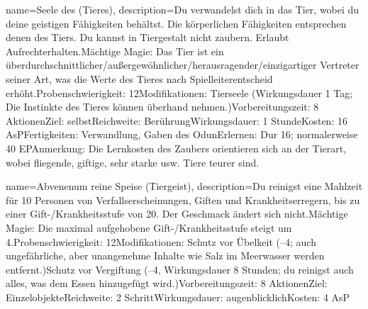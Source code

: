 {
    name={Seele des (Tieres)},
    description={Du verwandelst dich in das Tier, wobei du deine geistigen Fähigkeiten behältst. Die körperlichen Fähigkeiten entsprechen denen des Tiers. Du kannst in Tiergestalt nicht zaubern. Erlaubt Aufrechterhalten.\newline Mächtige Magie: Das Tier ist ein überdurchschnittlicher/außergewöhnlicher/herausragender/einzigartiger Vertreter seiner Art, was die Werte des Tieres nach Spielleiterentscheid erhöht.\newline Probenschwierigkeit: 12\newline Modifikationen: Tierseele (Wirkungsdauer 1 Tag; Die Instinkte des Tieres können überhand nehmen.)\newline Vorbereitungszeit: 8 Aktionen\newline Ziel: selbst\newline Reichweite: Berührung\newline Wirkungsdauer: 1 Stunde\newline Kosten: 16 AsP\newline Fertigkeiten: Verwandlung, Gaben des Odun\newline Erlernen: Dur 16; normalerweise 40 EP\newline Anmerkung: Die Lernkosten des Zaubers orientieren sich an der Tierart, wobei fliegende, giftige, sehr starke usw. Tiere teurer sind.}
}


{
    name={Abvenenum reine Speise (Tiergeist)},
    description={Du reinigst eine Mahlzeit für 10 Personen von Verfallserscheinungen, Giften und Krankheitserregern, bis zu einer Gift-/Krankheitsstufe von 20. Der Geschmack ändert sich nicht.\newline Mächtige Magie: Die maximal aufgehobene Gift-/Krankheitsstufe steigt um 4.\newline Probenschwierigkeit: 12\newline Modifikationen: Schutz vor Übelkeit (–4; auch ungefährliche, aber unangenehme Inhalte wie Salz im Meerwasser werden entfernt.)\newline Schutz vor Vergiftung (–4, Wirkungsdauer 8 Stunden; du reinigst auch alles, was dem Essen hinzugefügt wird.)\newline Vorbereitungszeit: 8 Aktionen\newline Ziel: Einzelobjekte\newline Reichweite: 2 Schritt\newline Wirkungsdauer: augenblicklich\newline Kosten: 4 AsP}
}


